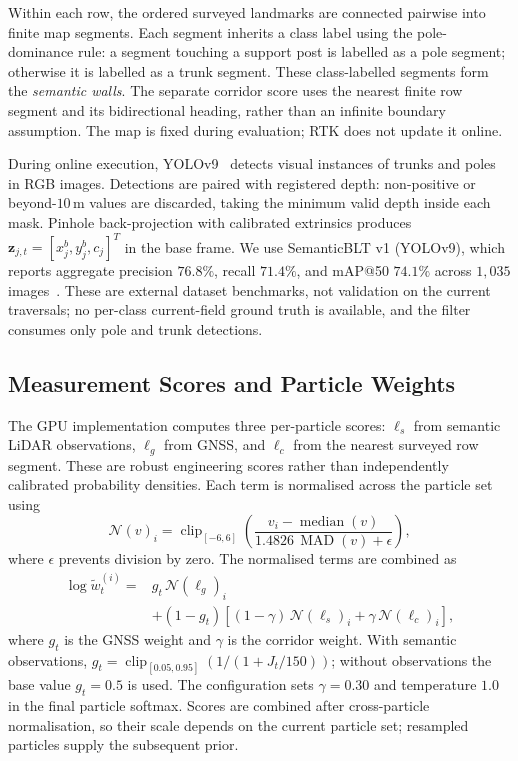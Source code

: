 \documentclass[letterpaper, 10 pt, conference]{ieeeconf}
\begin{document}
Within each row, the ordered surveyed landmarks are connected pairwise into finite map segments. Each segment inherits a class label using the pole-dominance rule: a segment touching a support post is labelled as a pole segment; otherwise it is labelled as a trunk segment. These class-labelled segments form the \emph{semantic walls}. The separate corridor score uses the nearest finite row segment and its bidirectional heading, rather than an infinite boundary assumption. The map is fixed during evaluation; RTK does not update it online.

During online execution, YOLOv9~\cite{yolov9} detects visual instances of trunks and poles in RGB images. Detections are paired with registered depth: non-positive or beyond-$10\,$m values are discarded, taking the minimum valid depth inside each mask. Pinhole back-projection with calibrated extrinsics produces $\mathbf{z}_{j,t}=[x_j^b,y_j^b,c_j]^T$ in the base frame. We use SemanticBLT v1 (YOLOv9), which reports aggregate precision $76.8\%$, recall $71.4\%$, and mAP@50 $74.1\%$ across $1{,}035$ images~\cite{semanticblt_dataset}. These are external dataset benchmarks, not validation on the current traversals; no per-class current-field ground truth is available, and the filter consumes only pole and trunk detections.

\subsection{Measurement Scores and Particle Weights}
The GPU implementation computes three per-particle scores: $\ell_s$ from semantic LiDAR observations, $\ell_g$ from GNSS, and $\ell_c$ from the nearest surveyed row segment. These are robust engineering scores rather than independently calibrated probability densities. Each term is normalised across the particle set using
\begin{equation}
\mathcal{N}(v)_i = \operatorname{clip}_{[-6,6]}\left(\frac{v_i-\operatorname{median}(v)}{1.4826\,\operatorname{MAD}(v)+\epsilon}\right),
\end{equation}
where $\epsilon$ prevents division by zero. The normalised terms are combined as
\begin{equation}
\begin{aligned}
\log \widetilde{w}_t^{(i)} ={}& g_t\,\mathcal{N}(\ell_g)_i \\
&+ (1-g_t)\left[(1-\gamma)\,\mathcal{N}(\ell_s)_i + \gamma\,\mathcal{N}(\ell_c)_i\right],
\end{aligned}
\end{equation}
where $g_t$ is the GNSS weight and $\gamma$ is the corridor weight. With semantic observations, $g_t=\operatorname{clip}_{[0.05,0.95]}(1/(1+J_t/150))$; without observations the base value $g_t=0.5$ is used. The configuration sets $\gamma=0.30$ and temperature $1.0$ in the final particle softmax. Scores are combined after cross-particle normalisation, so their scale depends on the current particle set; resampled particles supply the subsequent prior.
\end{document}
